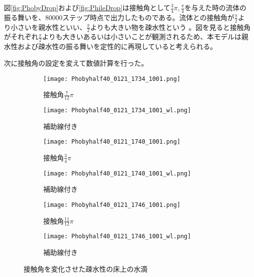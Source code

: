 \documentclass[]{jsarticle}
\begin{document}
図\ref{fig:PhobyDrop}および\ref{fig:PhileDrop}は接触角として$\frac{3}{4}\pi, \frac{\pi}{4}$を与えた時の流体の振る舞いを、80000ステップ時点で出力したものである。流体との接触角が$\frac{\pi}{2}$より小さいを親水性といい、$\frac{\pi}{2}$よりも大きい物を疎水性という \cite{Law2014}。図を見ると接触角がそれぞれ$\frac{\pi}{2}$よりも大きいあるいは小さいことが観測されるため、本モデルは親水性および疎水性の振る舞いを定性的に再現していると考えられる。

次に接触角の設定を変えて数値計算を行った。
\begin{figure}[H]
  \centering
  \begin{subfigure}{0.45\columnwidth}
    \centering
    \texttt{[image: Phobyhalf40\_0121\_1734\_1001.png]}
    \caption{接触角$\frac{7}{12}\pi$}
    \label{fig:phoby_pi3}
  \end{subfigure}
  \begin{subfigure}{0.45\columnwidth}
    \centering
    \texttt{[image: Phobyhalf40\_0121\_1734\_1001\_wl.png]}
    \caption{補助線付き}
    \label{fig:phoby_pi3wl}
  \end{subfigure}

  \begin{subfigure}{0.45\columnwidth}
    \centering
    \texttt{[image: Phobyhalf40\_0121\_1740\_1001.png]}
    \caption{接触角$\frac{3}{4}\pi$}
    \label{fig:phoby_pi4}
  \end{subfigure}
  \begin{subfigure}{0.45\columnwidth}
    \centering
    \texttt{[image: Phobyhalf40\_0121\_1740\_1001\_wl.png]}
    \caption{補助線付き}
    \label{fig:phoby_pi4wl}
  \end{subfigure}

  \begin{subfigure}{0.45\columnwidth}
    \centering
    \texttt{[image: Phobyhalf40\_0121\_1746\_1001.png]}
    \caption{接触角$\frac{11}{12}\pi$}
    \label{fig:phoby_pi6}
  \end{subfigure}
  \begin{subfigure}{0.45\columnwidth}
    \centering
    \texttt{[image: Phobyhalf40\_0121\_1746\_1001\_wl.png]}
    \caption{補助線付き}
    \label{fig:phoby_pi6wl}
  \end{subfigure}

  \caption{接触角を変化させた疎水性の床上の水滴}
  \label{fig:compHydrophoby}
\end{figure}
\end{document}
